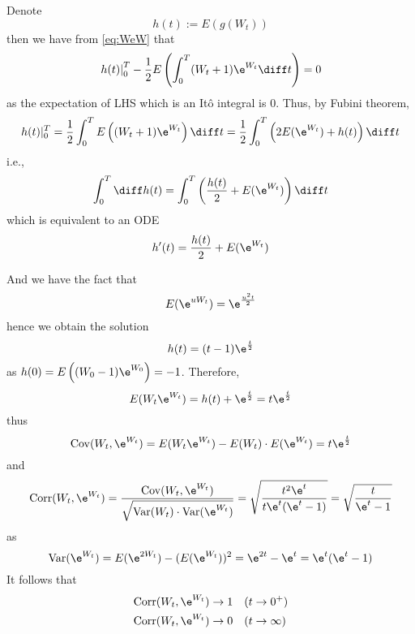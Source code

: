     Denote
    \[h(t):=E(g(W_t))\]
    then we have from \cref{eq:WeW} that
    \[\left.h(t)\right|_0^T
    -\frac{1}{2}E\left(\int_0^T(W_t+1)\e^{W_t}\diff t\right)=0\]
    as the expectation of LHS which is an It\^o integral is 0.
    Thus, by Fubini theorem,
    \[h(t)|_0^T=\frac{1}{2}\int_0^TE\left((W_t+1)\e^{W_t}\right)\diff t
    =\frac{1}{2}\int_0^T\left(2E(\e^{W_t})+h(t)\right)\diff t\]
    i.e.,
    \[\int_0^T\diff h(t)=\int_0^T\left(\frac{h(t)}{2}
    +E(\e^{W_t})\right)\diff t\]
    which is equivalent to an ODE
    \[h'(t)=\frac{h(t)}{2}+E(\e^{W_t})\]

    And we have the fact that
    \[E(\e^{uW_t})=\e^{\frac{u^2t}2}\]
    hence we obtain the solution
    \[h(t)=(t-1)\e^{\frac{t}{2}}\]
    as $h(0)=E\left((W_0-1)\e^{W_0}\right)=-1$.
    Therefore,
    \[E(W_t\e^{W_t})=h(t)+\e^{\frac{t}{2}}=t\e^{\frac{t}{2}}\]
    thus
    \def\cov{\mathrm{Cov}}
    \def\var{\mathrm{Var}}
    \def\corr{\mathrm{Corr}}
    \[\cov(W_t,\e^{W_t})=E(W_t\e^{W_t})-E(W_t)\cdot E(\e^{W_t})
    =t\e^{\frac{t}{2}}\]
    and
    \[\corr(W_t,\e^{W_t})=\frac{\cov(W_t,\e^{W_t})}%
    {\sqrt{\var(W_t)\cdot\var(\e^{W_t})}}
    =\sqrt{\frac{t^2\e^t}{t\e^t(\e^t-1)}}
    =\sqrt{\frac{t}{\e^t-1}}\]
    as
    \[\var(\e^{W_t})=E(\e^{2W_t})-(E(\e^{W_t}))^2
    =\e^{2t}-\e^t=
    \e^t(\e^t-1)\]
    It follows that
    \[\begin{aligned}
        \corr(W_t,\e^{W_t})&\to 1\quad(t\to 0^+)\\
        \corr(W_t,\e^{W_t})&\to 0\quad(t\to \infty)
    \end{aligned}\]

